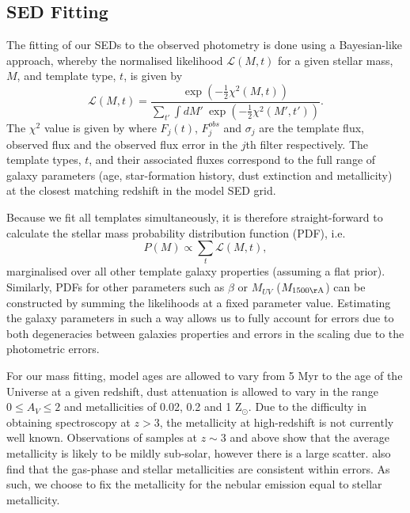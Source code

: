 \subsection{SED Fitting}
The fitting of our SEDs to the observed photometry is done using a Bayesian-like approach, whereby the normalised likelihood $\mathcal{L}(M,t)$ for a given stellar mass, $M$, and template type, $t$, is given by
\begin{equation}
 \mathcal{L}(M,t) = \frac{\exp(-\tfrac{1}{2}\chi^{2}(M,t))}
          {\sum_{t'} \int dM' ~ \exp(-\tfrac{1}{2}\chi^{2}(M',t'))}.
\end{equation}
The $\chi^2$ value is given by where $F_{j}(t)$, $F_{j}^{obs}$ and $\sigma_{j}$ are the template flux, observed flux and the observed flux error in the $j$th filter respectively. The template types, $t$, and their associated fluxes correspond to the full range of galaxy parameters (age, star-formation history, dust extinction and metallicity) at the closest matching redshift in the model SED grid.

Because we fit all templates simultaneously, it is therefore straight-forward to calculate the stellar mass probability distribution function (PDF), i.e. 
\begin{equation}
  P(M) \propto \sum_{t} \mathcal{L}(M,t),
\end{equation}
marginalised over all other template galaxy properties (assuming a flat prior). Similarly, PDFs for other parameters such as $\beta$ or $M_{UV}$ ($M_{1500\rm{\AA}}$) can be constructed by summing the likelihoods at a fixed parameter value. Estimating the galaxy parameters in such a way allows us to fully account for errors due to both degeneracies between galaxies properties and errors in the scaling due to the photometric errors.

For our mass fitting, model ages are allowed to vary from 5 Myr to the age of the Universe at a given redshift, dust attenuation is allowed to vary in the range $0 \le A_{V} \le 2$ and metallicities of 0.02, 0.2 and 1 Z$_{\odot}$. Due to the difficulty in obtaining spectroscopy at $z > 3$, the metallicity at high-redshift is not currently well known. Observations of samples at $z \sim 3$ and above \citep{Shapley:2003wi,2008ASPC..396..409M,2012A&A...539A.136S,Jones:2012kn} show that the average metallicity is likely to be mildly sub-solar, however there is a large scatter. \citet{2012A&A...539A.136S} also find that the gas-phase and stellar metallicities are consistent within errors. As such, we choose to fix the metallicity for the nebular emission equal to stellar metallicity.

